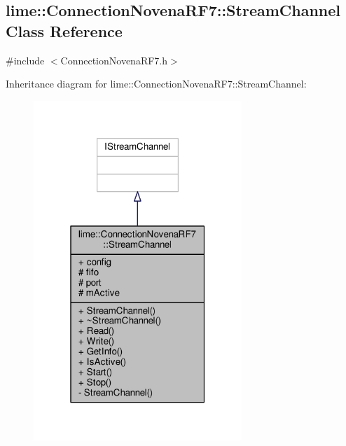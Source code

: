 \subsection{lime\+:\+:Connection\+Novena\+R\+F7\+:\+:Stream\+Channel Class Reference}
\label{classlime_1_1ConnectionNovenaRF7_1_1StreamChannel}


{\ttfamily \#include $<$Connection\+Novena\+R\+F7.\+h$>$}



Inheritance diagram for lime\+:\+:Connection\+Novena\+R\+F7\+:\+:Stream\+Channel\+:
\nopagebreak
\begin{figure}[H]
\begin{center}
\leavevmode
\includegraphics[width=223pt]{d4/db7/classlime_1_1ConnectionNovenaRF7_1_1StreamChannel__inherit__graph}
\end{center}
\end{figure}



